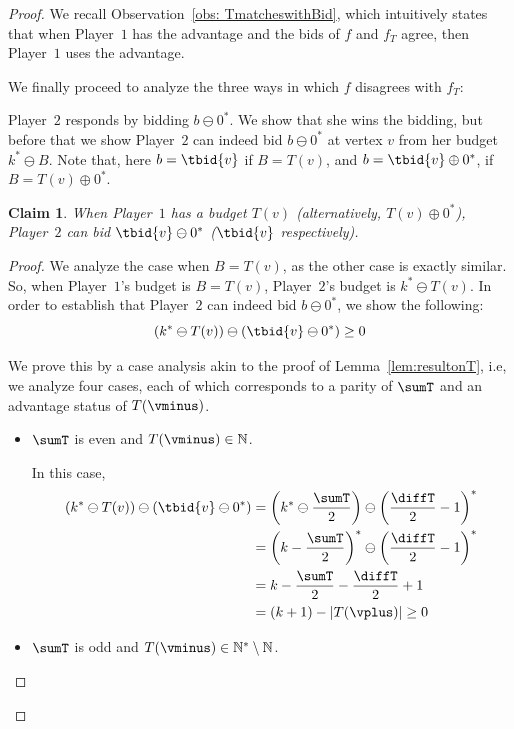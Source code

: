 \documentclass{article}\providecommand{\nequiv}{\not\equiv}\usepackage[a4paper,margin=20mm]{geometry}
\newtheorem*{claim*}{Claim}\newtheorem{fact}[theorem]{Fact}\newtheorem{techclaim}[theorem]{Claim}\newtheorem{open}[theorem]{Open Problem}\newenvironment{cfigure}[1][htbp]{\begin{figure}[#1]\centering}{\end{figure}}\newenvironment{sidefigure}[1][htbp]{\begin{figure}[#1]\centering}{\end{figure}}\newenvironment{csidefigure}[1][htbp]{\begin{figure}[#1]\centering}{\end{figure}}\newenvironment{subproof}[1][Proof]{\begin{proof}[#1]}{\end{proof}}
\newcommand{\PO}{Player~$1$\xspace}
\newcommand{\PT}{Player~$2$\xspace}
\newcommand{\Nat}{\mathbb{N}}
\newcommand{\Natstro}{\mathbb{N}^* \setminus \mathbb{N}}
\newcommand{\succb}[1]{#1 \oplus 0^*\xspace}
\newcommand{\predb}[1]{#1 \ominus 0^*\xspace}
\newcommand{\succInt}[1]{\left(#1\right)^*}
\newcommand{\adjustbrac}[1]{\left(#1\right)}
\newcommand{\absolut}[1]{|#1|}
\newcommand{\half}[1]{\frac{#1}{2}}
\begin{document}
\begin{proof}
We recall Observation~\ref{obs: TmatcheswithBid}, which intuitively states that when \PO has the advantage and the bids of $f$ and $f_T$ agree, then \PO uses the advantage. 


We finally proceed to analyze the three ways in which $f$ disagrees with $f_T$:


\PT responds by bidding $b \ominus 0^*$. 
We show that she wins the bidding, but before that %
we show  \PT can indeed bid \(b \ominus 0^*\) at vertex \(v\) from her budget \(k^* \ominus B\).
Note that, here \(b = \tbid{v}\) if \(B = T(v)\), and \(b = \succb{\tbid{v}}\), if \(B = \succb{T(v)}\). 

\begin{claim*}\label{clm: PTcanbid}
	When \PO has a budget \(T(v)\) (alternatively, \(\succb{T(v)}\)), \PT can bid \(\predb{\tbid{v}}\) (\(\tbid{v}\) respectively). 
\end{claim*}

\begin{subproof}
	We analyze the case when  \(B = T(v)\), as the other case is exactly similar.
	So, when \PO's budget is \(B = T(v)\), \PT's budget is \(k^* \ominus T(v)\). 
	In order to establish that \PT can indeed bid \(\predb{b}\), we show the following:
	\begin{equation*}
		(k^* \ominus T(v)) \ominus (\predb{\tbid{v}}) \geq 0
	\end{equation*}
	
	We prove this by a case analysis akin to the proof of Lemma~\ref{lem:resultonT}, i.e, we analyze four cases, each of which corresponds to a parity of \(\sumT\) and an advantage status of \(T(\vminus)\). 
	\begin{itemize}
		\item \(\sumT\) is even and \(T(\vminus) \in \Nat\). 
		
		In this case, 
		\begin{align*}
			\adjustbrac{k^* \ominus T(v)} \ominus \adjustbrac{\predb{\tbid{v}}} &= \adjustbrac{k^* \ominus \half{\sumT}} \ominus \succInt{\half{\diffT} -1}\\
			&= \succInt{k - \half{\sumT}} \ominus \succInt{\half{\diffT} -1} \\
			&= k - \half{\sumT} - \half{\diffT} + 1\\
			&= \adjustbrac{k+1} - \absolut{T(\vplus)} \geq 0 
		\end{align*}
	
	\item \(\sumT\) is odd and \(T(\vminus) \in \Natstro\). 
	

\end{itemize}
\end{subproof}
\end{proof}
\end{document}

